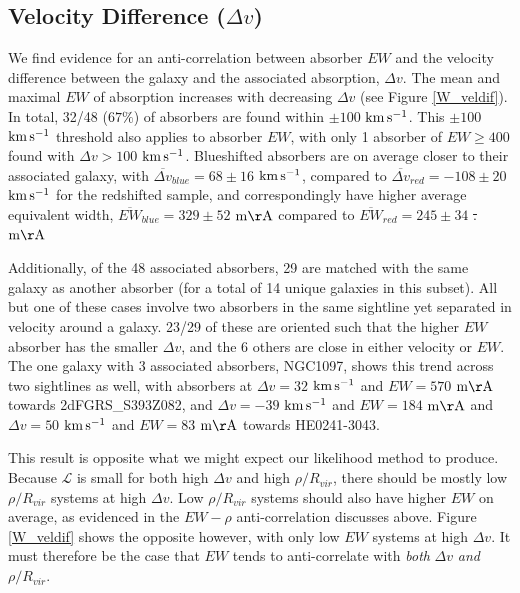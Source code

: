 \documentclass[twocolumn,tighten]{aastex6}
\providecommand{\DIFadd}[1]{{\protect\color{blue}\uwave{#1}}} %
\providecommand{\DIFdel}[1]{{\protect\color{red}\sout{#1}}}                      %
\providecommand{\DIFaddbegin}{} %
\providecommand{\DIFaddend}{} %
\providecommand{\DIFdelbegin}{} %
\providecommand{\DIFdelend}{} %
\begin{document}
\subsection{Velocity Difference \rm($\Delta v$\rm)}
\DIFaddbegin \label{veldiff}
\DIFaddend 

We find evidence for an anti-correlation between absorber $EW$ and the velocity difference between the galaxy and the associated absorption, $\Delta v$. The mean and maximal $EW$ of absorption increases with decreasing $\Delta v$ (see Figure \ref{W_veldif}). In total, 32/48 ($67\%$) of absorbers are found within $\pm100$ $\rm km\, s^{-1}$. This $\pm100$ $\rm km\, s^{-1}$ threshold also applies to absorber $EW$, with only 1 absorber of $EW \geq 400$ found with $\Delta v > 100$ $\rm km\, s^{-1}$. Blueshifted absorbers are on average closer to their associated galaxy, with $\overline{\Delta v}_{blue} = 68\pm16$ $\rm km\, s^{-1}$, compared to $\overline{\Delta v}_{red}=-108\pm20$ $\rm km\, s^{-1}$ for the redshifted sample, and correspondingly have higher average equivalent width, $\overline{EW}_{blue}=329\pm52$ $\rm m\AA$ compared to $\overline{EW}_{red}=245\pm34$ \DIFdelbegin \DIFdel{. }\DIFdelend $\rm m\AA$

Additionally, of the 48 associated absorbers, 29 are matched with the same galaxy as another absorber (for a total of 14 unique galaxies in this subset). All but one of these cases involve two absorbers in the same sightline yet separated in velocity around a galaxy. 23/29 of these are oriented such that the higher $EW$ absorber has the smaller $\Delta v$, and the 6 others are close in either velocity or $EW$. The one galaxy with 3 associated absorbers, NGC1097, shows this trend across two sightlines as well, with absorbers at $\Delta v = 32$ $\rm km\, s^{-1}$ and $EW = 570$ $\rm m\AA$ towards 2dFGRS\_S393Z082, and $\Delta v = -39$ $\rm km\, s^{-1}$ and $EW = 184$ $\rm m\AA$ and $\Delta v = 50$ $\rm km\, s^{-1}$ and $EW = 83$ $\rm m\AA$ towards HE0241-3043.

This result is opposite what we might expect \DIFaddbegin \textbf{\DIFadd{selection effects associated with}} \DIFaddend our likelihood method to produce. Because $\mathcal{L}$ is small for both high $\Delta v$ and high $\rho / R_{vir}$, there should be mostly low $\rho / R_{vir}$ systems at high $\Delta v$. Low $\rho / R_{vir}$ systems should also have higher $EW$ on average, as evidenced in the $EW-\rho$ anti-correlation discusses above. Figure \ref{W_veldif} shows the opposite however, with only low $EW$ systems at high $\Delta v$. It must therefore be the case that $EW$ tends to anti-correlate with \textit{both} $\Delta v$ \textit{and} $\rho / R_{vir}$.
\end{document}
